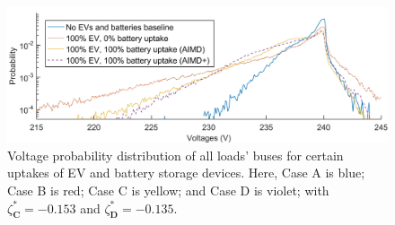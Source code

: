 \begin{figure}[htb]\centering
 \includegraphics{_chapter1/fig/input/voltage-excerpt}
 \caption{Voltage probability distribution of all loads' buses for certain uptakes of EV and battery storage devices. Here, Case {A} is blue; Case {B} is red; Case {C} is yellow; and Case {D} is violet; with $\zeta_\textbf{C}^{*} = -0.153$ and $\zeta_\textbf{D}^{*}=-0.135$.}
 \label{ch1:fig:voltage-violation-excerpt}
\end{figure}
